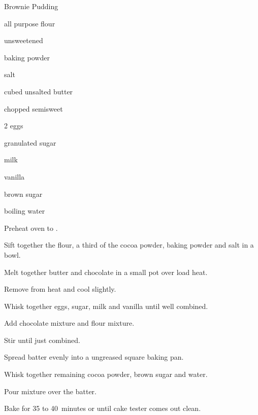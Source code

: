\begin{recipe}{Brownie Pudding}{}{}

\begin{ingredients}
\item {} all purpose flour
\item \C{\twothird} unsweetened 
\item {} baking powder
\item \tp{\half} salt
\item {} cubed unsalted butter
\item \C{\half} chopped semisweet 
\item 2 eggs
\item {} granulated sugar
\item \C{\half} milk
\item {} vanilla
\item \C{\half} brown sugar
\item \C{1\third} boiling water
\end{ingredients}

\begin{directions}
\item Preheat oven to .
\item Sift together the flour, a third of the cocoa powder, baking powder and salt in a bowl.
\item Melt together butter and chocolate in a small pot over load heat.
\item Remove from heat and cool slightly.
\item Whisk together eggs, sugar, milk and vanilla until well combined.
\item Add chocolate mixture and flour mixture.
\item Stir until just combined.
\item Spread batter evenly into a ungreased  square baking pan.
\item Whisk together remaining cocoa powder, brown sugar and water.
\item Pour mixture over the batter.
\item Bake for 35 to 40~minutes or until cake tester comes out clean.
\end{directions}

\end{recipe}
